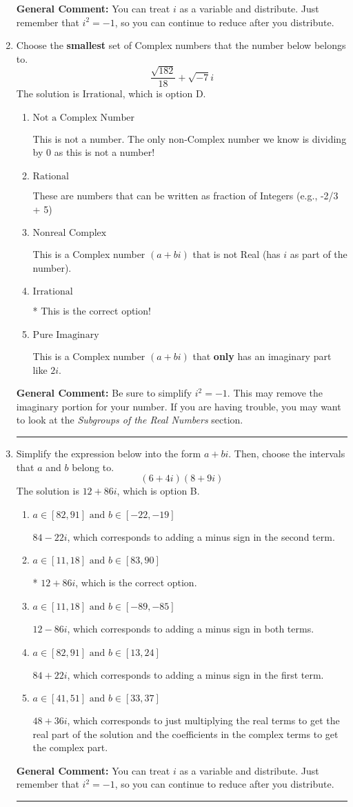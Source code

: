 \documentclass{extbook}[14pt]
\newcommand{\litem}[1]{\item #1

\rule{\textwidth}{0.4pt}}
\begin{document}
\begin{enumerate}
{\textbf{General Comment:} You can treat $i$ as a variable and distribute. Just remember that $i^2=-1$, so you can continue to reduce after you distribute.
}
\litem{
Choose the \textbf{smallest} set of Complex numbers that the number below belongs to.
\[ \frac{\sqrt{182}}{18}+\sqrt{-7}i \]The solution is \( \text{Irrational} \), which is option D.\begin{enumerate}[label=\Alph*.]
\item \( \text{Not a Complex Number} \)

This is not a number. The only non-Complex number we know is dividing by 0 as this is not a number!
\item \( \text{Rational} \)

These are numbers that can be written as fraction of Integers (e.g., -2/3 + 5)
\item \( \text{Nonreal Complex} \)

This is a Complex number $(a+bi)$ that is not Real (has $i$ as part of the number).
\item \( \text{Irrational} \)

* This is the correct option!
\item \( \text{Pure Imaginary} \)

This is a Complex number $(a+bi)$ that \textbf{only} has an imaginary part like $2i$.
\end{enumerate}

\textbf{General Comment:} Be sure to simplify $i^2 = -1$. This may remove the imaginary portion for your number. If you are having trouble, you may want to look at the \textit{Subgroups of the Real Numbers} section.
}
\litem{
Simplify the expression below into the form $a+bi$. Then, choose the intervals that $a$ and $b$ belong to.
\[ (6 + 4 i)(8 + 9 i) \]The solution is \( 12 + 86 i \), which is option B.\begin{enumerate}[label=\Alph*.]
\item \( a \in [82, 91] \text{ and } b \in [-22, -19] \)

 $84 - 22 i$, which corresponds to adding a minus sign in the second term.
\item \( a \in [11, 18] \text{ and } b \in [83, 90] \)

* $12 + 86 i$, which is the correct option.
\item \( a \in [11, 18] \text{ and } b \in [-89, -85] \)

 $12 - 86 i$, which corresponds to adding a minus sign in both terms.
\item \( a \in [82, 91] \text{ and } b \in [13, 24] \)

 $84 + 22 i$, which corresponds to adding a minus sign in the first term.
\item \( a \in [41, 51] \text{ and } b \in [33, 37] \)

 $48 + 36 i$, which corresponds to just multiplying the real terms to get the real part of the solution and the coefficients in the complex terms to get the complex part.
\end{enumerate}

\textbf{General Comment:} You can treat $i$ as a variable and distribute. Just remember that $i^2=-1$, so you can continue to reduce after you distribute.
}
\end{enumerate}
\end{document}
